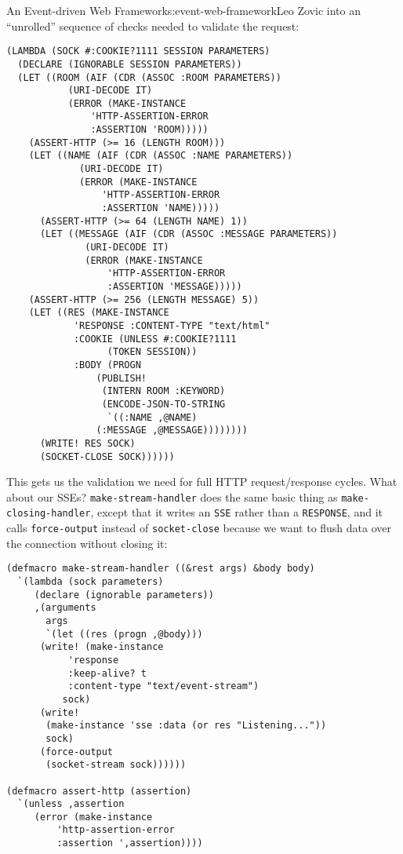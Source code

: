 \begin{aosachapter}{An Event-driven Web Framework}{s:event-web-framework}{Leo Zovic}
into an ``unrolled'' sequence of checks needed to validate the request:

\begin{verbatim}
(LAMBDA (SOCK #:COOKIE?1111 SESSION PARAMETERS)
  (DECLARE (IGNORABLE SESSION PARAMETERS))
  (LET ((ROOM (AIF (CDR (ASSOC :ROOM PARAMETERS))
           (URI-DECODE IT)
           (ERROR (MAKE-INSTANCE
               'HTTP-ASSERTION-ERROR
               :ASSERTION 'ROOM)))))
    (ASSERT-HTTP (>= 16 (LENGTH ROOM)))
    (LET ((NAME (AIF (CDR (ASSOC :NAME PARAMETERS))
             (URI-DECODE IT)
             (ERROR (MAKE-INSTANCE
                 'HTTP-ASSERTION-ERROR
                 :ASSERTION 'NAME)))))
      (ASSERT-HTTP (>= 64 (LENGTH NAME) 1))
      (LET ((MESSAGE (AIF (CDR (ASSOC :MESSAGE PARAMETERS))
              (URI-DECODE IT)
              (ERROR (MAKE-INSTANCE
                  'HTTP-ASSERTION-ERROR
                  :ASSERTION 'MESSAGE)))))
    (ASSERT-HTTP (>= 256 (LENGTH MESSAGE) 5))
    (LET ((RES (MAKE-INSTANCE
            'RESPONSE :CONTENT-TYPE "text/html"
            :COOKIE (UNLESS #:COOKIE?1111
                  (TOKEN SESSION))
            :BODY (PROGN
                (PUBLISH!
                 (INTERN ROOM :KEYWORD)
                 (ENCODE-JSON-TO-STRING
                  `((:NAME ,@NAME)
                (:MESSAGE ,@MESSAGE))))))))
      (WRITE! RES SOCK)
      (SOCKET-CLOSE SOCK))))))
\end{verbatim}

This gets us the validation we need for full HTTP request/response
cycles. What about our SSEs? \texttt{make-stream-handler} does the same
basic thing as \texttt{make-closing-handler}, except that it writes an
\texttt{SSE} rather than a \texttt{RESPONSE}, and it calls
\texttt{force-output} instead of \texttt{socket-close} because we want
to flush data over the connection without closing it:

\begin{verbatim}
(defmacro make-stream-handler ((&rest args) &body body)
  `(lambda (sock parameters)
     (declare (ignorable parameters))
     ,(arguments
       args
       `(let ((res (progn ,@body)))
      (write! (make-instance
           'response
           :keep-alive? t
           :content-type "text/event-stream")
          sock)
      (write!
       (make-instance 'sse :data (or res "Listening..."))
       sock)
      (force-output
       (socket-stream sock))))))

(defmacro assert-http (assertion)
  `(unless ,assertion
     (error (make-instance
         'http-assertion-error
         :assertion ',assertion))))
\end{verbatim}


\end{aosachapter}
